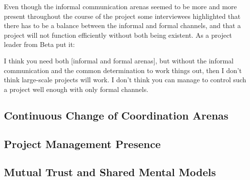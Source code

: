 Even though the informal communication arenas seemed to be more and more present throughout the course of the project some interviewees highlighted that there has to be a balance between the informal and formal channels, and that a project will not function efficiently without both being existent. As a project leader from Beta put it:

\begin{fancyquotes}
I think you need both [informal and formal arenas], but without the informal communication and the common determination to work things out, then I don't think large-scale projects will work. I don't think you can manage to control such a project well enough with only formal channels.
\end{fancyquotes}

\subsection{Continuous Change of Coordination Arenas}

\subsection{Project Management Presence}

\subsection{Mutual Trust and Shared Mental Models}





